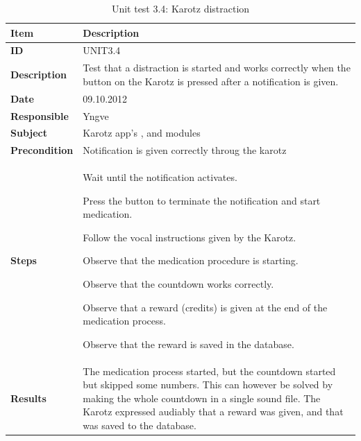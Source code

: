 \begin{table}
	\begin{center}
		\begin{tabular}{|p{3.0cm}|p{14.0cm}|}
			\hline
			\bf{Item} & \bf{Description}\\
			\hline
			\bf{ID} & UNIT3.4\\
			\bf{Description} & Test that a distraction is started and works correctly when the button on the Karotz is pressed after a notification is given. \\
			\bf{Date} & 09.10.2012\\
			\bf{Responsible} & Yngve\\
			\bf{Subject} & Karotz app's \code{Repository}, \code{Notification} and \code{Medication} modules\\
			\bf{Precondition} & Notification is given correctly throug the karotz \\
			\bf{Steps} &
			\begin{tabulenum}
				\item Wait until the notification activates.
				\item Press the button to terminate the notification and start medication.
				\item Follow the vocal instructions given by the Karotz.
				\item Observe that the medication procedure is starting.
				\item Observe that the countdown works correctly.
				\item Observe that a reward (credits) is given at the end of the medication process.
				\item Observe that the reward is saved in the database. 
			\end{tabulenum}\\
			\hline
			\bf{Results} & The medication process started, but the countdown started but skipped some numbers. This can however be solved by
			making the whole countdown in a single sound file. The Karotz expressed audiably that a reward was given, and that was saved to
			the database. \\
			\hline
		\end{tabular}
	\end{center}
	\caption{Unit test 3.4: Karotz distraction}
	\label{tab:unit3.4}
\end{table}

